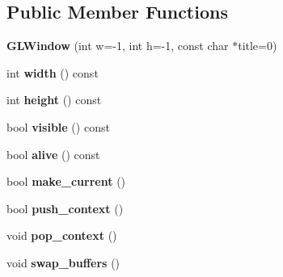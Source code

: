 \subsection*{Public Member Functions}
\begin{DoxyCompactItemize}
\item 
\mbox{\label{classglwindow_1_1_g_l_window_af9e5d6539cdf2b606f7f83959cba4d91}} 
{\bfseries G\+L\+Window} (int w=-\/1, int h=-\/1, const char $\ast$title=0)
\item 
\mbox{\label{classglwindow_1_1_g_l_window_ae10e25d700ab0697b2ed42d66a8e4540}} 
int {\bfseries width} () const
\item 
\mbox{\label{classglwindow_1_1_g_l_window_aa3ca7cb6e058f1eef4dd769664f98b14}} 
int {\bfseries height} () const
\item 
\mbox{\label{classglwindow_1_1_g_l_window_a0791d0c8205ba2c2541903cf258a58f4}} 
bool {\bfseries visible} () const
\item 
\mbox{\label{classglwindow_1_1_g_l_window_a8a3a6133efd40d58e6b083469c286825}} 
bool {\bfseries alive} () const
\item 
\mbox{\label{classglwindow_1_1_g_l_window_aee36cf4ab449a96fcaa0f01cd382c618}} 
bool {\bfseries make\+\_\+current} ()
\item 
\mbox{\label{classglwindow_1_1_g_l_window_ad3e8ca520080b92dd961b4d6708a011a}} 
bool {\bfseries push\+\_\+context} ()
\item 
\mbox{\label{classglwindow_1_1_g_l_window_ac3dc676910b6a4f09616e2a3d41ef8ac}} 
void {\bfseries pop\+\_\+context} ()
\item 
\mbox{\label{classglwindow_1_1_g_l_window_a82eaf4b8f8f86ee3cf0cef21aef2a4bd}} 
void {\bfseries swap\+\_\+buffers} ()
\item 
\mbox{\label{classglwindow_1_1_g_l_window_a6e13fa434eb57f3338da78362b225fde}} 

\end{DoxyCompactItemize}
